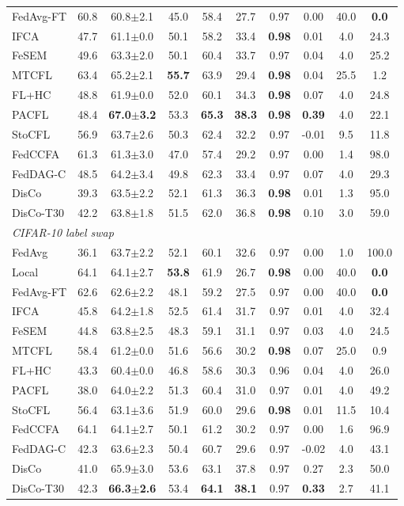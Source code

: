 \begin{tabular}{lccccccccc}
FedAvg-FT & 60.8 & 60.8$\pm$2.1 & 45.0 & 58.4 & 27.7 & 0.97 & 0.00 & 40.0 & \textbf{0.0} \\
IFCA & 47.7 & 61.1$\pm$0.0 & 50.1 & 58.2 & 33.4 & \textbf{0.98} & 0.01 & 4.0 & 24.3 \\
FeSEM & 49.6 & 63.3$\pm$2.0 & 50.1 & 60.4 & 33.7 & 0.97 & 0.04 & 4.0 & 25.2 \\
MTCFL & 63.4 & 65.2$\pm$2.1 & \textbf{55.7} & 63.9 & 29.4 & \textbf{0.98} & 0.04 & 25.5 & 1.2 \\
FL+HC & 48.8 & 61.9$\pm$0.0 & 52.0 & 60.1 & 34.3 & \textbf{0.98} & 0.07 & 4.0 & 24.8 \\
PACFL & 48.4 & \textbf{67.0$\pm$3.2} & 53.3 & \textbf{65.3} & \textbf{38.3} & \textbf{0.98} & \textbf{0.39} & 4.0 & 22.1 \\
StoCFL & 56.9 & 63.7$\pm$2.6 & 50.3 & 62.4 & 32.2 & 0.97 & -0.01 & 9.5 & 11.8 \\
FedCCFA & 61.3 & 61.3$\pm$3.0 & 47.0 & 57.4 & 29.2 & 0.97 & 0.00 & 1.4 & 98.0 \\
FedDAG-C & 48.5 & 64.2$\pm$3.4 & 49.8 & 62.3 & 33.4 & 0.97 & 0.07 & 4.0 & 29.3 \\
DisCo & 39.3 & 63.5$\pm$2.2 & 52.1 & 61.3 & 36.3 & \textbf{0.98} & 0.01 & 1.3 & 95.0 \\
DisCo-T30 & 42.2 & 63.8$\pm$1.8 & 51.5 & 62.0 & 36.8 & \textbf{0.98} & 0.10 & 3.0 & 59.0 \\
\midrule
\multicolumn{10}{l}{\textit{CIFAR-10 label swap}}\\
FedAvg & 36.1 & 63.7$\pm$2.2 & 52.1 & 60.1 & 32.6 & 0.97 & 0.00 & 1.0 & 100.0 \\
Local & 64.1 & 64.1$\pm$2.7 & \textbf{53.8} & 61.9 & 26.7 & \textbf{0.98} & 0.00 & 40.0 & \textbf{0.0} \\
FedAvg-FT & 62.6 & 62.6$\pm$2.2 & 48.1 & 59.2 & 27.5 & 0.97 & 0.00 & 40.0 & \textbf{0.0} \\
IFCA & 45.8 & 64.2$\pm$1.8 & 52.5 & 61.4 & 31.7 & 0.97 & 0.01 & 4.0 & 32.4 \\
FeSEM & 44.8 & 63.8$\pm$2.5 & 48.3 & 59.1 & 31.1 & 0.97 & 0.03 & 4.0 & 24.5 \\
MTCFL & 58.4 & 61.2$\pm$0.0 & 51.6 & 56.6 & 30.2 & \textbf{0.98} & 0.07 & 25.0 & 0.9 \\
FL+HC & 43.3 & 60.4$\pm$0.0 & 46.8 & 58.6 & 30.3 & 0.96 & 0.04 & 4.0 & 26.0 \\
PACFL & 38.0 & 64.0$\pm$2.2 & 51.3 & 60.4 & 31.0 & 0.97 & 0.01 & 4.0 & 49.2 \\
StoCFL & 56.4 & 63.1$\pm$3.6 & 51.9 & 60.0 & 29.6 & \textbf{0.98} & 0.01 & 11.5 & 10.4 \\
FedCCFA & 64.1 & 64.1$\pm$2.7 & 50.1 & 61.2 & 30.2 & 0.97 & 0.00 & 1.6 & 96.9 \\
FedDAG-C & 42.3 & 63.6$\pm$2.3 & 50.4 & 60.7 & 29.6 & 0.97 & -0.02 & 4.0 & 43.1 \\
DisCo & 41.0 & 65.9$\pm$3.0 & 53.6 & 63.1 & 37.8 & 0.97 & 0.27 & 2.3 & 50.0 \\
DisCo-T30 & 42.3 & \textbf{66.3$\pm$2.6} & 53.4 & \textbf{64.1} & \textbf{38.1} & 0.97 & \textbf{0.33} & 2.7 & 41.1 \\
\bottomrule
\end{tabular}
